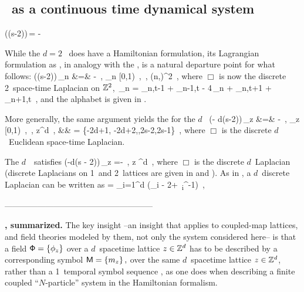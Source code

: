 \subsection{\tempLatt\ as a continuous time dynamical system}
\label{s:catLattODE}

\beq
 ((s-2))\,\Xx = -\Mm
{}

While the $d=2$ \catlatt\ does have a Hamiltonian
formulation, its Lagrangian  formulation as {\sPe}
, in analogy with the {\templatt} , is
a natural departure point for what follows:
\bea
 (({s}-2))\,\ssp_{n\zeit} &=& -
    \,, \qquad
  \ssp_{n\zeit} \in [0,1)
    \,, \quad
   \in \A
    \,, \quad
  (n,\zeit)\in \integers^{2}
\,,
\label{2dCoupledCats}
\eea
where $\Box$ is now the discrete 2\dmn\ space-time Laplacian
on $\mathbb{Z}^2$,
\beq
\Box\,\ssp_{n\zeit} =                   \ssp_{n,t-1} + \ssp_{n-1,t}
                   - 4\,\ssp_{n\zeit} + \ssp_{n,t+1} + \ssp_{n+1,t}
\,,
and the alphabet is given in .

     {
More generally, the same argument yields the {\sPe}  for
the $d$\dmn\ {\em \catlatt}
\bea
 (\Box - d({s}-2))\,\ssp_{z} &=& -
    \,, \qquad
  \ssp_{z} \in [0,1)
    \,, \quad
   \in \A
    \,, \quad
  z\in \integers^{d}
\,,
\continue
 && \A = \{-2d+1, -2d+2,\cdots,2{s}-2,2{s}-1\}
\,,
\label{LinearConn}
\eea
where $\Box$ is the discrete $d$\dmn\ Euclidean space-time Laplacian.
}

     {

The $d$\dmn\ \catlatt\ satisfies {\sPe} 
\beq
(\Box -d(s - 2))\,\ssp_{z} =-
\,,\qquad
{z} \in \integers^d
\,,
where $\Box$ is the discrete $d$\dmn\ Laplacian
(discrete Laplacians on 1\dmn\ and 2\dmn\ lattices are given in
 and ). As in , a
$d$\dmn\ discrete Laplacian can be written as
\beq
\Box = \sum_{i=1}^{d} (\hopMat_{i}  - 2\unit + \hopMat_{i}^{-1})
\,,
    }


------------------------------------------------------

\bigskip

\noindent\textbf{\catLatt, summarized.}
The
key insight --an insight that applies to coupled-map
lattices, and field theories
modeled by them, not only the system considered here-- is that a field
\(
\Xx=\{\ssp_{z}\} %
\)
over a $d$\dmn\ spacetime lattice $z\in \mathbb{Z}^{d}$ has to be
described by a corresponding symbol {\brick}
\(
\Mm=\{\m_{z}\} %
\,,
\)
over the same $d$\dmn\ spacetime  lattice $z\in \mathbb{Z}^{d}$, rather
than a 1\dmn\ temporal symbol sequence , as one does when
describing a finite coupled ``$N$-particle'' system in the Hamiltonian
formalism.

